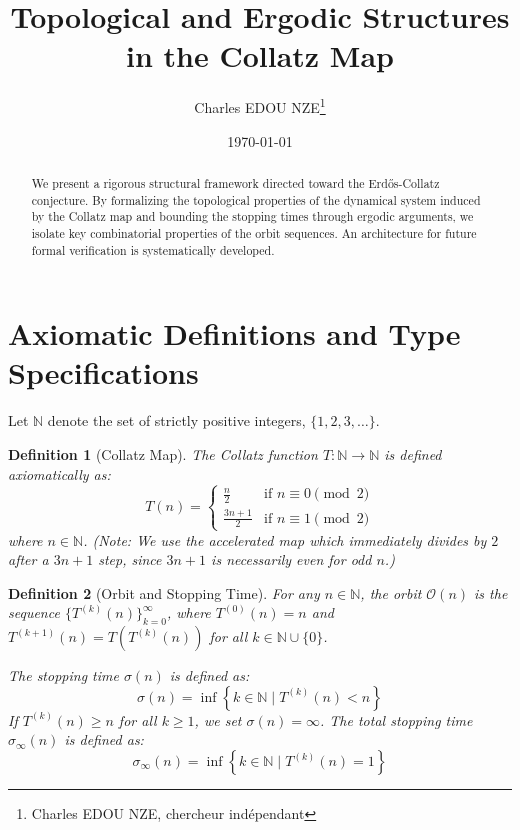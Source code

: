 \documentclass[12pt,a4paper]{article}
\title{Topological and Ergodic Structures in the Collatz Map}
\author{Charles EDOU NZE\thanks{Charles EDOU NZE, chercheur ind\'ependant}}
\date{\today}
\newtheorem{definition}{Definition}
\begin{document}
\maketitle

\begin{abstract}
We present a rigorous structural framework directed toward the Erd\H{o}s-Collatz conjecture. By formalizing the topological properties of the dynamical system induced by the Collatz map and bounding the stopping times through ergodic arguments, we isolate key combinatorial properties of the orbit sequences. An architecture for future formal verification is systematically developed.
\end{abstract}

\tableofcontents
\newpage

\section{Axiomatic Definitions and Type Specifications}

Let $\mathbb{N}$ denote the set of strictly positive integers, $\{1, 2, 3, \ldots \}$.

\begin{definition}[Collatz Map]
The Collatz function $T : \mathbb{N} \to \mathbb{N}$ is defined axiomatically as:
$$
T(n) =
\begin{cases}
\frac{n}{2} & \text{if } n \equiv 0 \pmod 2 \\
\frac{3n + 1}{2} & \text{if } n \equiv 1 \pmod 2
\end{cases}
$$
where $n \in \mathbb{N}$. (Note: We use the accelerated map which immediately divides by $2$ after a $3n+1$ step, since $3n+1$ is necessarily even for odd $n$.)
\end{definition}

\begin{definition}[Orbit and Stopping Time]
For any $n \in \mathbb{N}$, the orbit $\mathcal{O}(n)$ is the sequence $\{ T^{(k)}(n) \}_{k=0}^{\infty}$, where $T^{(0)}(n) = n$ and $T^{(k+1)}(n) = T(T^{(k)}(n))$ for all $k \in \mathbb{N} \cup \{0\}$.

The stopping time $\sigma(n)$ is defined as:
$$ \sigma(n) = \inf \left\{ k \in \mathbb{N} \mid T^{(k)}(n) < n \right\} $$
If $T^{(k)}(n) \geq n$ for all $k \geq 1$, we set $\sigma(n) = \infty$.
The total stopping time $\sigma_{\infty}(n)$ is defined as:
$$ \sigma_{\infty}(n) = \inf \left\{ k \in \mathbb{N} \mid T^{(k)}(n) = 1 \right\} $$
\end{definition}
\end{document}
